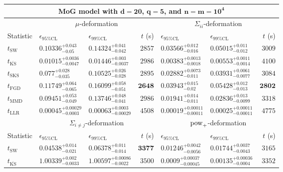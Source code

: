 \begin{tabular}{l|llr|llr}
	\toprule
	\multicolumn{7}{c}{{\bf MoG model with $\mathbf{d=20}$, $\mathbf{q=5}$, and $\mathbf{n=m=10^{4}}$}} \\
	\toprule
	\multicolumn{1}{c}{} & \multicolumn{3}{c}{$\mu$-deformation} & \multicolumn{3}{c}{$\Sigma_{ii}$-deformation} \\
	Statistic & $\epsilon_{95\%\mathrm{CL}}$ & $\epsilon_{99\%\mathrm{CL}}$ & $t$ (s) & $\epsilon_{95\%\mathrm{CL}}$ & $\epsilon_{99\%\mathrm{CL}}$ & $t$ (s) \\
	\midrule
	$t_{\mathrm{SW}}$ & $0.10336_{-0.05}^{+0.043}$ & $0.14324_{-0.042}^{+0.041}$ & $2857$ & $0.03566_{-0.016}^{+0.012}$ & $0.05015_{-0.012}^{+0.011}$ & $3009$ \\
	$t_{\overline{\mathrm{KS}}}$ & ${\mathbf{0.01015_{-0.0047}^{+0.0036}}}$ & ${\mathbf{0.01446_{-0.0037}^{+0.003}}}$ & $2986$ & ${\mathbf{0.00383_{-0.0018}^{+0.0013}}}$ & ${\mathbf{0.00553_{-0.0014}^{+0.0011}}}$ & $4100$ \\
	$t_{\mathrm{SKS}}$ & $0.077_{-0.035}^{+0.028}$ & $0.10525_{-0.028}^{+0.026}$ & $2895$ & $0.02882_{-0.011}^{+0.0073}$ & $0.03931_{-0.0077}^{+0.0061}$ & $3084$ \\
	$t_{\mathrm{FGD}}$ & $0.11749_{-0.065}^{+0.064}$ & $0.16099_{-0.051}^{+0.058}$ & ${\mathbf{2648}}$ & $0.03943_{-0.02}^{+0.015}$ & $0.05428_{-0.013}^{+0.012}$ & ${\mathbf{2802}}$ \\
	$t_{\mathrm{MMD}}$ & $0.09451_{-0.049}^{+0.053}$ & $0.13746_{-0.041}^{+0.048}$ & $2986$ & $0.01941_{-0.011}^{+0.014}$ & $0.02836_{-0.0099}^{+0.013}$ & $3318$ \\
	$t_{\mathrm{LLR}}$ & $0.00045_{-0.0003}^{+0.00029}$ & $0.00063_{-0.00029}^{+0.0003}$ & $4508$ & $0.00019_{-0.00011}^{+0.00011}$ & $0.00025_{-0.00011}^{+0.00011}$ & $4775$ \\
	\toprule
	\multicolumn{1}{c}{} & \multicolumn{3}{c}{$\Sigma_{i\neq j}$-deformation} & \multicolumn{3}{c}{$\rm{pow}_{+}$-deformation} \\
	Statistic & $\epsilon_{95\%\mathrm{CL}}$ & $\epsilon_{99\%\mathrm{CL}}$ & $t$ (s) & $\epsilon_{95\%\mathrm{CL}}$ & $\epsilon_{99\%\mathrm{CL}}$ & $t$ (s) \\
	\midrule
	$t_{\mathrm{SW}}$ & $0.04538_{-0.021}^{+0.014}$ & $0.06378_{-0.014}^{+0.011}$ & ${\mathbf{3377}}$ & $0.01246_{-0.0056}^{+0.0042}$ & $0.01744_{-0.0043}^{+0.0037}$ & $3165$ \\
	$t_{\overline{\mathrm{KS}}}$ & $1.00339_{-0.0033}^{+0.002}$ & $1.00597_{-0.0022}^{+0.00086}$ & $3500$ & ${\mathbf{0.0009_{-0.00045}^{+0.00037}}}$ & ${\mathbf{0.00135_{-0.0004}^{+0.00036}}}$ & $3352$ \\

\end{tabular}
